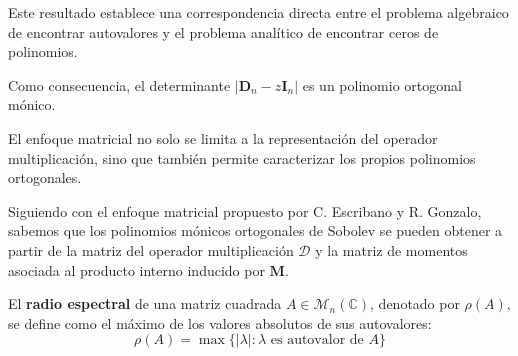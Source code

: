 Este resultado establece una correspondencia directa entre el problema algebraico de encontrar autovalores y el problema analítico de encontrar ceros de polinomios.

\noindent Como consecuencia, el determinante $|\mathbf{D}_n -z \mathbf{I}_n|$ es un polinomio ortogonal mónico.

El enfoque matricial no solo se limita a la representación del operador multiplicación, sino que también permite caracterizar los propios polinomios ortogonales.

Siguiendo con el enfoque matricial propuesto por C. Escribano y R. Gonzalo, sabemos que los polinomios mónicos ortogonales de Sobolev se pueden obtener a partir de la matriz del operador multiplicación $\mathcal{D}$ y la matriz de momentos asociada al producto interno inducido por $\mathbf{M}$.

\begin{definition}\label{def:spectral_radius}
  \cite{dunford1963linear} El \textbf{radio espectral} de una matriz cuadrada $A \in \mathcal{M}_{n}(\mathbb{C})$, denotado por $\rho(A)$, se define como el máximo de los valores absolutos de sus autovalores:
  \begin{equation}
    \rho(A) = \max\{|\lambda| : \lambda \text{ es autovalor de } A\}
  \end{equation}
\end{definition}

